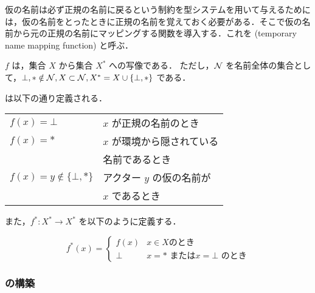 




仮の名前は必ず正規の名前に戻るという制約を型システムを用いて与えるためには，仮の名前をとったときに正規の名前を覚えておく必要がある．そこで仮の名前から元の正規の名前にマッピングする関数を導入する．これを \tmp (temporary name mapping function) と呼ぶ．

\begin{dfn}[\tmp]
  \tmp $f$ は，集合 $X$ から集合 $X^*$ への写像である．
  ただし，${\cal N}$ を名前全体の集合として，$ \bot, \ast \notin {\cal N}, X \subset {\cal N}, X^* = X \cup \{\bot,\ast\} $ である．
\end{dfn}

\tmp は以下の通り定義される．

\begin{table}[htb]
  \begin{tabular}{ll}
    $ f(x) = \bot $ & $ x $ が正規の名前のとき \\
    $ f(x) = \ast $ & $ x $ が環境から隠されている \\
    & 名前であるとき \\
    $ f(x) = y \notin \{\bot,\ast\} $ & アクター $ y $ の仮の名前が \\
    & $ x $ であるとき
  \end{tabular}
\end{table}

また，$f^{*} : X^* \rightarrow X^*$ を以下のように定義する．

\begin{adjustvboxheight}
  \[ f^{*}(x) = \begin{cases}
    f(x) & x \in X \mbox{のとき} \\
    \bot & x = \ast \mbox{\ または} x = \bot \mbox{\ のとき}
  \end{cases} \]
  \vspace{1pt}
\end{adjustvboxheight}


\subsubsection{\tmp の構築}


